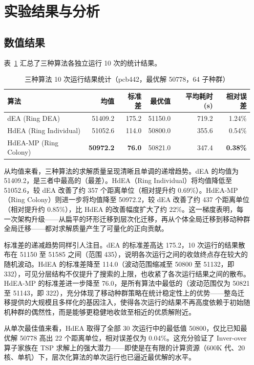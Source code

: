 \section{实验结果与分析}

\subsection{数值结果}

表~\ref{tab:results} 汇总了三种算法各独立运行 10 次的统计结果。

\begin{table}[H]
\centering
\caption{三种算法 10 次运行结果统计（pcb442，最优解 50778，64 子种群）}
\label{tab:results}
\begin{tabular}{lrrrrr}
\toprule
算法 & 均值 & 标准差 & 最优值 & 平均耗时(s) & 相对误差 \\
\midrule
dEA (Ring DEA) & 51409.2 & 175.2 & 51150.0 & 719.2 & 1.24\% \\
HdEA (Ring Individual) & 51052.6 & 114.0 & 50800.0 & 355.6 & 0.54\% \\
HdEA-MP (Ring Colony) & \textbf{50972.2} & \textbf{76.0} & 50821.0 & 347.4 & \textbf{0.38\%} \\
\bottomrule
\end{tabular}
\end{table}

从均值来看，三种算法的求解质量呈现清晰且单调的递增趋势。dEA 的均值为 51409.2，是三者中最高的（最差）。HdEA（Ring Individual）将均值降低至 51052.6，较 dEA 改善了约 357 个距离单位（相对提升约 0.69\%）。HdEA-MP（Ring Colony）则进一步将均值降至 50972.2，较 dEA 改善了约 437 个距离单位（相对提升约 0.85\%），比 HdEA 的改善幅度扩大了约 22\%。这一梯度表明，每一次架构升级——从扁平的环形迁移到层次化迁移，再从个体全局迁移到移动种群全局迁移——都对求解质量产生了可量化的正向贡献。

标准差的递减趋势同样引人注目。dEA 的标准差高达 175.2，10 次运行的结果散布在 51150 至 51585 之间（范围 435），说明各次运行之间的收敛终点存在较大的随机波动。HdEA 的标准差降至 114.0（波动范围缩减至 50800 至 51132，即 332），可见分层结构不仅提升了搜索的上限，也收紧了各次运行结果之间的散布。HdEA-MP 的标准差进一步降至 76.0，是所有算法中最低的（波动范围仅为 50821 至 51143，即 322），充分体现了移动种群策略在统计稳定性上的优势——整岛迁移提供的大规模且多样化的基因注入，使得各次运行的结果不再高度依赖于初始随机种群的偶然性，而是能够更稳健地收敛至相近的优质解附近。

从单次最佳值来看，HdEA 取得了全部 30 次运行中的最低值 50800，仅比已知最优解 50778 高出 22 个距离单位，相对误差仅为 0.04\%。这充分验证了 Inver-over 算子家族在 TSP 求解上的强大潜力——即使是在有限的计算资源（600K 代、20 核、单机）下，层次化算法的单次运行也已逼近最优解的水平。


